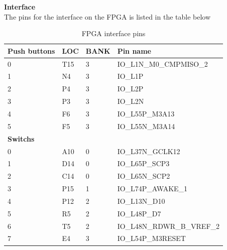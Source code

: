 \textbf{Interface}\\
The pins for the interface on the FPGA is listed in the table below
\begin{table}[H]
    \begin{tabular}{|p{3cm}|p{3cm}|p{3cm}|p{5cm}|}
        \hline
        \textbf{Push buttons} & \textbf{LOC} & \textbf{BANK} & \textbf{Pin name}     \\ \hline
        0                     & T15          & 3             & IO\_L1N\_M0\_CMPMISO\_2   \\ \hline
        1                     & N4           & 3             & IO\_L1P                \\ \hline
        2                     & P4           & 3             & IO\_L2P                \\ \hline
        3                     & P3           & 3             & IO\_L2N                \\ \hline
        4                     & F6           & 3             & IO\_L55P\_M3A13         \\ \hline
        5                     & F5           & 3             & IO\_L55N\_M3A14         \\ \hline
        \textbf{Switchs}      & ~            & ~             & ~                     \\ \hline
        0                     & A10          & 0             & IO\_L37N\_GCLK12        \\ \hline
        1                     & D14          & 0             & IO\_L65P\_SCP3          \\ \hline
        2                     & C14          & 0             & IO\_L65N\_SCP2          \\ \hline
        3                     & P15          & 1             & IO\_L74P\_AWAKE\_1       \\ \hline
        4                     & P12          & 2             & IO\_L13N\_D10           \\ \hline
        5                     & R5           & 2             & IO\_L48P\_D7            \\ \hline
        6                     & T5           & 2             & IO\_L48N\_RDWR\_B\_VREF\_2 \\ \hline
        7                     & E4           & 3             & IO\_L54P\_M3RESET       \\
        \hline
    \end{tabular}
    \caption{FPGA interface pins}
\end{table}

